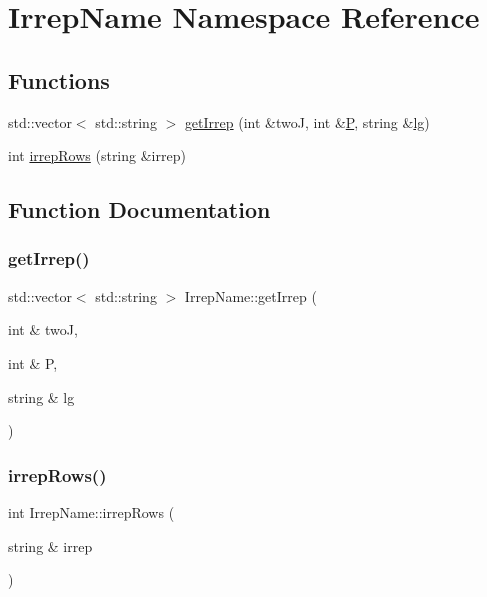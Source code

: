 \hypertarget{namespaceIrrepName}{}\section{Irrep\+Name Namespace Reference}
\label{namespaceIrrepName}
\subsection*{Functions}
\begin{DoxyCompactItemize}
\item 
std\+::vector$<$ std\+::string $>$ \mbox{\hyperlink{namespaceIrrepName_aafd6a227d49ac073e93e6954332007bf}{get\+Irrep}} (int \&twoJ, int \&\mbox{\hyperlink{adat__devel_2lib_2hadron_2operator__name__util_8cc_aef94be98e2c9e4a4dece75f60ca9792c}{P}}, string \&\mbox{\hyperlink{adat__devel_2lib_2hadron_2irrep__util_8cc_a4d8a3f7f88843b4554b53842b9951ece}{lg}})
\item 
int \mbox{\hyperlink{namespaceIrrepName_a3964736788de2a425b5a41ff069f907b}{irrep\+Rows}} (string \&irrep)
\end{DoxyCompactItemize}


\subsection{Function Documentation}
\mbox{\label{namespaceIrrepName_aafd6a227d49ac073e93e6954332007bf}} 
\subsubsection{\texorpdfstring{getIrrep()}{getIrrep()}}
{\footnotesize\ttfamily std\+::vector$<$ std\+::string $>$ Irrep\+Name\+::get\+Irrep (\begin{DoxyParamCaption}\item[{int \&}]{twoJ,  }\item[{int \&}]{P,  }\item[{string \&}]{lg }\end{DoxyParamCaption})}

\mbox{\label{namespaceIrrepName_a3964736788de2a425b5a41ff069f907b}} 
\subsubsection{\texorpdfstring{irrepRows()}{irrepRows()}}
{\footnotesize\ttfamily int Irrep\+Name\+::irrep\+Rows (\begin{DoxyParamCaption}\item[{string \&}]{irrep }\end{DoxyParamCaption})}


